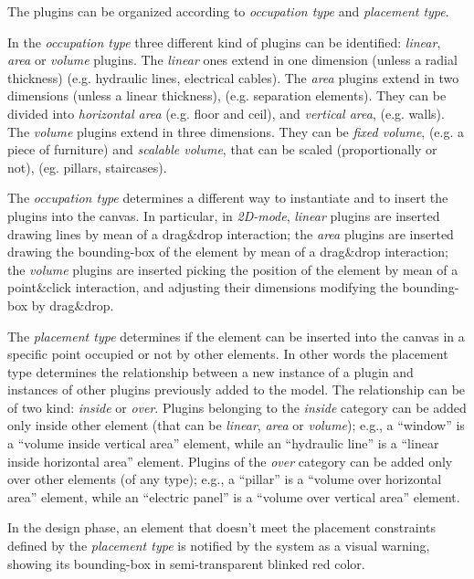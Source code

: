 \noindent The plugins can be organized according to \emph{occupation type} and \emph{placement type}. 

In the \emph{occupation type} three different kind of plugins can be identified: \emph{linear}, \emph{area} or \emph{volume} plugins.
The \emph{linear} ones extend in one dimension (unless a radial thickness) (e.g. hydraulic lines, electrical cables). The \emph{area} plugins extend in two dimensions (unless a linear thickness), (e.g. separation elements). They can be divided into \emph{horizontal area} (e.g. floor and ceil), and \emph{vertical area}, (e.g. walls). The \emph{volume} plugins extend in three dimensions. They can be \emph{fixed volume}, (e.g. a piece of furniture) and \emph{scalable volume}, that can be scaled (proportionally or not), (eg. pillars, staircases).

The \emph{occupation type} determines a different way to instantiate and to insert the plugins into the canvas.
In particular, in \emph{2D-mode}, \emph{linear} plugins are inserted drawing lines by mean of a drag\&drop interaction;
the \emph{area} plugins are inserted drawing the bounding-box of the element by mean of a drag\&drop interaction;
the \emph{volume} plugins are inserted picking the position of the element by mean of a point\&click interaction,
and adjusting their dimensions modifying the bounding-box by drag\&drop.

The \emph{placement type} determines if the element can be inserted into the canvas in a specific point occupied or not by other elements. In other words 
the {placement type} determines the relationship between a new instance of a plugin and instances of other plugins previously added to the model. The relationship can be of two kind: \emph{inside} or \emph{over}.
Plugins belonging to the \emph{inside} category can be added only inside other element (that can be \emph{linear}, \emph{area} or \emph{volume}); e.g., a ``window'' is a ``volume inside vertical area'' element,
while an ``hydraulic line'' is a ``linear inside horizontal area'' element.
Plugins of the \emph{over} category can be added only over other elements (of any type);
e.g., a ``pillar'' is a ``volume over horizontal area'' element,
while an ``electric panel'' is a ``volume over vertical area'' element.

In the design phase, an element that doesn't meet the placement constraints defined by the \emph{placement type} is notified by the system as a visual warning, showing its bounding-box in semi-transparent blinked red color.

